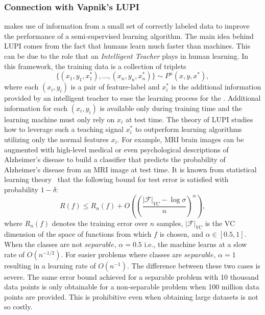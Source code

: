 \subsubsection{Connection with Vapnik's LUPI}
\label{sec:LUPI}
\fwl makes use of information from a small set of correctly labeled data to improve the performance of a semi-supervised learning algorithm. The main idea behind LUPI comes from the fact that humans learn much faster than machines. This can be due to the role that an \emph{Intelligent Teacher} plays in human learning. In this framework, the training data is a collection of triplets
\begin{equation}
    \{(x_1, y_1, x_1^*),\ldots,(x_n,y_n,x_n^*)\}\mathtt{\sim}P^n(x,y,x^*),
\end{equation}
where each ${(x_i,y_i)}$ is a pair of feature-label and $x_i^*$ is the additional information provided by an intelligent teacher to ease the learning process for the \std. Additional information for each ${(x_i,y_i)}$ is available only during training time and the learning machine must only rely on $x_i$ at test time. The theory of LUPI studies how to leverage such a teaching signal $x_i^*$ to outperform learning algorithms utilizing only the normal features $x_i$. For example, MRI brain images can be augmented with high-level medical or even psychological descriptions of Alzheimer's disease to build a classifier that predicts the probability of Alzheimer's disease from an MRI image at test time.
It is known from statistical learning theory~\citep{Vapnik1998} that the following bound for test error is satisfied with probability $1-\delta$:
\begin{equation}
\label{eq:LUPI_error_bound}
    R(f) \leq R_n(f) + O\left(\left(\frac{|\mathcal{F}|_{VC}-\log \sigma}{n}\right)^\alpha\right),
\end{equation}
where $R_n(f)$ denotes the training error over $n$ samples, $|\mathcal{F}|_{VC}$ is the VC dimension of the space of functions from which $f$ is chosen, and $\alpha \in [0.5,1]$. When the classes are not $separable$, $\alpha = 0.5$ i.e., the machine learns at a slow rate of $O(n^{-1/2})$. For easier problems where classes are $separable$, $\alpha=1$ resulting in a learning rate of $O(n^{-1})$.  The difference between these two cases is severe. The same error bound achieved for a separable problem with 10 thousand data points is only obtainable for a non-separable problem when 100 million data points are provided. This is prohibitive even when obtaining large datasets is not so costly. 

